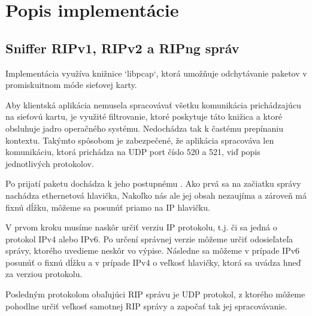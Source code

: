 \documentclass[12pt,a4paper,titlepage,final]{article}
\begin{document}


\pagestyle{plain}
\setcounter{page}{1}
\tableofcontents

\newpage
\pagestyle{plain}
\setcounter{page}{1}

\section{Popis implementácie} 

\subsection{Sniffer RIPv1, RIPv2 a RIPng správ}

Implementácia využíva knižnice `libpcap`, ktorá umožňuje odchytávanie paketov v promiskuitnom móde sieťovej karty.

Aby klientská aplikácia nemusela spracovávať všetku komunikácia prichádzajúcu na sieťovú kartu, je využité filtrovanie, ktoré poskytuje táto knižica a ktoré obsluhuje jadro operačného systému. Nedochádza tak k častému prepínaniu kontextu. Takýmto spôsobom je zabezpečené, že aplikácia spracováva len komunikáciu, ktorá prichádza na UDP port číslo 520 a 521, viď popis jednotlivých protokolov.

Po prijatí paketu dochádza k jeho postupnému . Ako prvá sa na začiatku správy nachádza ethernetová hlavička, Nakoľko nás ale jej obsah nezaujíma a zároveň má fixnú dĺžku, môžeme sa posunúť priamo na IP hlavičku.

V prvom kroku musíme naskôr určiť verziu IP protokolu, t.j. či sa jedná o protokol IPv4 alebo IPv6. Po určení správnej verzie môžeme určiť odosieľateľa správy, ktorého uvedieme neskôr vo výpise. Následne sa môžeme v prípade IPv6 posunúť o fixnú dĺžku a v prípade IPv4 o veľkosť hlavičky, ktorá sa uvádza hneď za verziou protokolu.

Posledným protokolom obaľujúci RIP správu je UDP protokol, z ktorého môžeme pohodlne určiť veľkosť samotnej RIP správy a započať tak jej spracovávanie.
\end{document}
